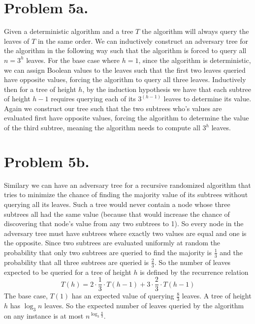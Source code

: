 \documentclass[12pt]{article}
\begin{document}
\section*{Problem 5a.}
Given a deterministic algorithm and a tree $T$ the algorithm will always query
the leaves of $T$ in the same order. We can inductively construct an adversary
tree for the algorithm in the following way such that the algorithm is forced to
query all $n = 3^h$ leaves. For the base case where $h = 1$, since the algorithm
is deterministic, we can assign Boolean values to the leaves such that the
first two leaves queried have opposite values, forcing the algorithm to query
all three leaves. Inductively then for a tree of height $h$, by the induction
hypothesis we have that each subtree of height $h-1$ requires querying each of
its $3^(h-1)$ leaves to determine its value. Again we construct our tree such
that the two subtrees who's values are evaluated first have opposite values,
forcing the algorithm to determine the value of the third subtree, meaning the
algorithm needs to compute all $3^h$ leaves.

\section*{Problem 5b.}
Similary we can have an adversary tree for a recursive randomized algorithm that
tries to minimize the chance of finding the majority value of its subtrees
without querying all its leaves. Such a tree would never contain a node whose
three subtrees all had the same value (because that would increase the chance of
discovering that node's value from any two subtrees to 1). So every node in the
adversary tree must have subtrees where exactly two values are equal and one
is the opposite. Since two subtrees are evaluated uniformly at random the
probability that only two subtrees are queried to find the majority is
$\frac{1}{3}$ and the probability that all three subtrees are queried is
$\frac{2}{3}$. So the number of leaves expected to be queried for a tree of
height $h$ is defined by the recurrence relation
$$T(h) = 2\cdot\frac{1}{3}\cdot T(h-1) + 3\cdot\frac{2}{3}\cdot T(h-1)$$
The base case, $T(1)$ has an expected value of querying $\frac{8}{3}$ leaves.
A tree of height $h$ has $\log_3 n$ leaves. So the expected number of leaves
queried by the algorithm on any instance is at most $n^{\log_3 \frac{8}{3}}$.
\end{document}
